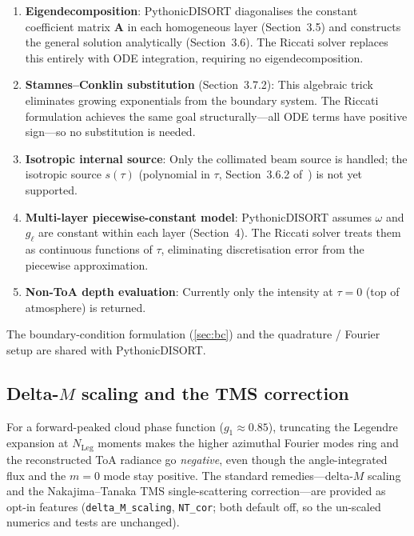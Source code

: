 \documentclass[11pt,a4paper]{article}
\newcommand{\mat}[1]{\mathbf{#1}}
\theoremstyle{definition}
\begin{document}
\begin{enumerate}[label=(\roman*)]
  \item \textbf{Eigendecomposition}: PythonicDISORT diagonalises the
    constant coefficient matrix $\mat{A}$ in each homogeneous layer
    (Section~3.5) and constructs the general solution analytically
    (Section~3.6).  The Riccati solver replaces this entirely with
    ODE integration, requiring no eigendecomposition.

  \item \textbf{Stamnes--Conklin substitution} (Section~3.7.2): This
    algebraic trick eliminates growing exponentials from the boundary
    system.  The Riccati formulation achieves the same goal
    structurally---all ODE terms have positive sign---so no substitution
    is needed.

  \item \textbf{Isotropic internal source}: Only the collimated beam
    source is handled; the isotropic source $s(\tau)$ (polynomial in
    $\tau$, Section~3.6.2 of~\cite{HP2024doc}) is not yet supported.

  \item \textbf{Multi-layer piecewise-constant model}: PythonicDISORT
    assumes $\omega$ and $g_\ell$ are constant within each layer
    (Section~4).  The Riccati solver treats them as continuous functions
    of $\tau$, eliminating discretisation error from the piecewise
    approximation.

  \item \textbf{Non-ToA depth evaluation}: Currently only the intensity
    at $\tau = 0$ (top of atmosphere) is returned.
\end{enumerate}

The boundary-condition formulation (\cref{sec:bc}) and the quadrature /
Fourier setup are shared with PythonicDISORT.

\subsection{Delta-$M$ scaling and the TMS correction}\label{sec:deltaM}

For a forward-peaked cloud phase function ($g_1\!\approx\!0.85$), truncating the
Legendre expansion at $N_{\mathrm{Leg}}$ moments makes the higher azimuthal
Fourier modes ring and the reconstructed ToA radiance go \emph{negative}, even
though the angle-integrated flux and the $m=0$ mode stay positive.  The standard
remedies---delta-$M$ scaling~\cite{Wiscombe1977} and the Nakajima--Tanaka TMS
single-scattering correction---are provided as opt-in features
(\texttt{delta\_M\_scaling}, \texttt{NT\_cor}; both default off, so the un-scaled
numerics and tests are unchanged).
\end{document}
